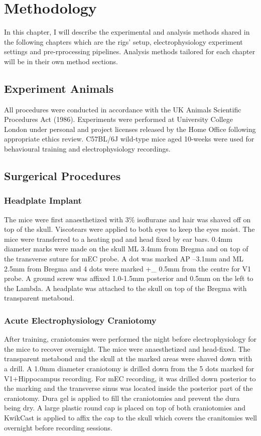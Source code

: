 \chapter{Methodology}
\label{chapterlabel2}

In this chapter, I will describe the experimental and analysis methods shared in the following chapters which are the rigs' setup, electrophysiology experiment settings and pre-rprocessing pipelines. Analysis methods tailored for each chapter will be in their own method sections. 

\section{Experiment Animals}
All procedures were conducted in accordance with the UK Animals Scientific Procedures Act (1986). Experiments were performed at University College London under personal and project licenses released by the Home Office following appropriate ethics review. C57BL/6J wild-type mice aged 10-weeks were used for behavioural training and electrophysiology recordings.

\section{ Surgerical Procedures}
\subsection{Headplate Implant}
The mice were first anaesthetized with 3\% isoflurane and hair was shaved off on top of the skull. Viscotears were applied to both eyes to keep the eyes moist. The mice were transferred to a heating pad and head fixed by ear bars. 0.4mm diameter marks were made on the skull ML 3.4mm from Bregma and on top of the transverse suture for mEC probe. A dot was marked AP –3.1mm and ML 2.5mm from Bregma and 4 dots were marked +\_ 0.5mm from the centre for V1 probe. A ground screw was affixed 1.0-1.5mm posterior and 0.5mm on the left to the Lambda. A headplate was attached to the skull on top of the Bregma with transparent metabond. 

\subsection{Acute Electrophysiology Craniotomy}
After training, craniotomies were performed the night before electrophysiology for the mice to recover overnight. The mice were anaesthetized and head-fixed. The transparent metabond and the skull at the marked areas were shaved down with a drill. A 1.0mm diameter craniotomy is drilled down from the 5 dots marked for V1+Hippocampus recording. For mEC recording, it was drilled down posterior to the marking and the transverse sinus was located inside the posterior part of the craniotomy. Dura gel is applied to fill the craniotomies and prevent the dura being dry. A large plastic round cap is placed on top of both craniotomies and KwikCast is applied to affix the cap to the skull which covers the cranitomies well overnight before recording sessions. 

